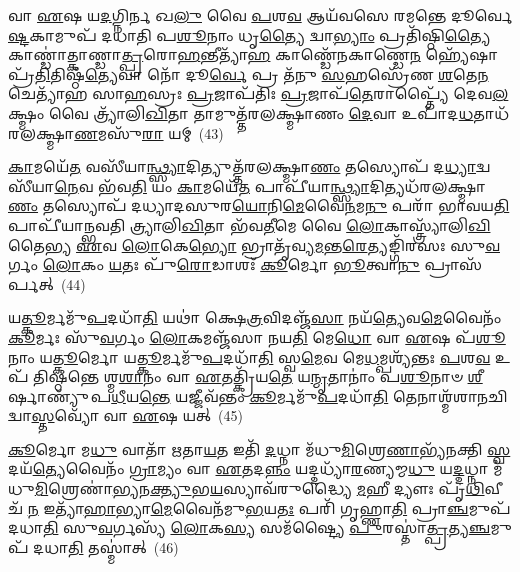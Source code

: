 𑌵𑌾 \ul{𑌏}\-𑌷 𑌯\-\ul{𑌦}\-𑌗𑍍𑌨𑌿𑌰𑍍𑌨 𑌖\-\ul{𑌲𑍁} 𑌵𑍈 \ul{𑌪}\-𑌶\-\ul{𑌵} 𑌆𑌯᳴𑌵𑌸𑍇 𑌰𑌮𑌨𑍍𑌤𑍇 𑌦𑍂𑌰𑍍𑌵𑍇\-\ul{𑌷𑍍𑌟}\-𑌕𑌾𑌮𑍁𑌪᳴ 𑌦𑌧𑌾𑌤𑌿 𑌪\-\ul{𑌶𑍂}\-𑌨𑌾𑌂 𑌧𑍃\-\ul{𑌤𑍍𑌯𑍈} 𑌦𑍍𑌵𑌾\-\ul{𑌭𑍍𑌯𑌾𑌂} 𑌪𑍍𑌰𑌤𑌿᳴𑌷𑍍𑌠𑌿\-\ul{𑌤𑍍𑌯𑍈} 𑌕𑌾𑌣𑍍𑌡𑌾॑𑌤𑍍𑌕𑌾𑌣𑍍𑌡𑌾\-\ul{𑌤𑍍𑌪𑍍𑌰}\-𑌰𑍋\-\ul{𑌹}\-𑌨𑍍𑌤𑍀𑌤𑍍𑌯𑌾᳴\-\ul{𑌹} 𑌕𑌾𑌣𑍍𑌡𑍇᳴𑌨𑌕𑌾𑌣𑍍𑌡𑍇\-\ul{𑌨} 𑌹𑍍𑌯𑍇᳴𑌷𑌾 𑌪𑍍𑌰᳴\-\ul{𑌤𑌿}\-𑌤𑌿𑌷𑍍𑌠᳴\-\ul{𑌤𑍍𑌯𑍇}\-𑌵𑌾 𑌨𑍋᳴ 𑌦𑍂\-\ul{𑌰𑍍𑌵𑍇} 𑌪𑍍𑌰 𑌤᳴𑌨𑍁 \ul{𑌸}\-𑌹𑌸𑍍𑌰𑍇᳴𑌣 \ul{𑌶}\-𑌤𑍇\-\ul{𑌨} 𑌚𑍇𑌤𑍍𑌯𑌾᳴𑌹 𑌸𑌾\-\ul{𑌹}\-𑌸𑍍𑌰𑌃 \ul{𑌪𑍍𑌰}\-𑌜𑌾𑌪᳴𑌤𑌿𑌃 \ul{𑌪𑍍𑌰}\-𑌜𑌾𑌪᳴\-\ul{𑌤𑍇}\-𑌰𑌾𑌪𑍍𑌤𑍍𑌯𑍈᳴ 𑌦𑍇𑌵\-\ul{𑌲}\-𑌕𑍍𑌷𑍍𑌮𑌂 𑌵𑍈 𑌤𑍍𑌰𑍍𑌯𑌾᳴𑌲𑌿\-\ul{𑌖𑌿}\-𑌤𑌾 𑌤𑌾𑌮𑍁𑌤𑍍𑌤᳴𑌰𑌲𑌕𑍍𑌷𑍍𑌮𑌾𑌣𑌂 \ul{𑌦𑍇}\-𑌵𑌾 𑌉𑌪𑌾᳴𑌦\-\ul{𑌧}\-𑌤𑌾𑌧᳴𑌰𑌲𑌕𑍍𑌷𑍍𑌮𑌾\-\ul{𑌣}\-𑌮𑌸𑍁᳴\-\ul{𑌰𑌾} 𑌯𑌮𑍍~(43)

\-\ul{𑌕𑌾}\-𑌮𑌯𑍇᳴\-\ul{𑌤} 𑌵𑌸𑍀᳴𑌯𑌾\-\ul{𑌨𑍍𑌥𑍍𑌸𑍍𑌯𑌾}\-𑌦𑌿𑌤𑍍𑌯𑍁𑌤𑍍𑌤᳴𑌰𑌲𑌕𑍍𑌷𑍍𑌮𑌾\-\ul{𑌣𑌂} 𑌤𑌸𑍍𑌯𑍋𑌪᳴ 𑌦\-\ul{𑌧𑍍𑌯𑌾}\-𑌦𑍍𑌵𑌸𑍀᳴𑌯𑌾\-\ul{𑌨𑍇}\-𑌵 𑌭᳴𑌵\-\ul{𑌤𑌿} 𑌯𑌂 \ul{𑌕𑌾}\-𑌮𑌯𑍇᳴\-\ul{𑌤} 𑌪𑌾𑌪𑍀᳴𑌯𑌾\-\ul{𑌨𑍍𑌥𑍍𑌸𑍍𑌯𑌾}\-𑌦𑌿𑌤𑍍𑌯𑌧᳴𑌰\-𑌲𑌕𑍍𑌷𑍍𑌮𑌾\-\ul{𑌣𑌂} 𑌤𑌸𑍍𑌯𑍋𑌪᳴ 𑌦𑌧𑍍𑌯𑌾𑌦𑌸𑍁𑌰\-\ul{𑌯𑍋}\-𑌨𑌿\-\ul{𑌮𑍇}\-𑌵𑍈\-\ul{𑌨}\-𑌮\-\ul{𑌨𑍁} 𑌪𑌰𑌾᳴ 𑌭𑌾𑌵𑌯\-\ul{𑌤𑌿} 𑌪𑌾𑌪𑍀᳴𑌯𑌾𑌨𑍍𑌭𑌵𑌤𑌿 𑌤𑍍𑌰𑍍𑌯𑌾𑌲𑌿\-\ul{𑌖𑌿}\-𑌤𑌾 𑌭᳴𑌵\-\ul{𑌤𑍀}\-𑌮𑍇 𑌵𑍈 \ul{𑌲𑍋}\-𑌕𑌾\-𑌸𑍍𑌤𑍍𑌰𑍍𑌯𑌾᳴𑌲𑌿\-\ul{𑌖𑌿}\-𑌤𑍈𑌭𑍍𑌯 \ul{𑌏}\-𑌵 \ul{𑌲𑍋}\-𑌕𑍇\-\ul{𑌭𑍍𑌯𑍋} 𑌭𑍍𑌰𑌾𑌤𑍃᳴𑌵𑍍𑌯\-\ul{𑌮}\-𑌨𑍍𑌤\-\ul{𑌰𑍇}\-𑌤𑍍𑌯𑌙𑍍𑌗𑌿᳴𑌰𑌸𑌃 𑌸𑍁\-\ul{𑌵}\-𑌰𑍍𑌗𑌂 \ul{𑌲𑍋}\-𑌕𑌂 \ul{𑌯}\-𑌤𑌃 𑌪𑍁᳴\-\ul{𑌰𑍋}\-𑌡𑌾𑌶𑌃᳴ \ul{𑌕𑍂}\-𑌰𑍍𑌮𑍋 \ul{𑌭𑍂}\-𑌤𑍍𑌵𑌾\-\ul{𑌨𑍁} 𑌪𑍍𑌰𑌾𑌸᳴𑌰𑍍𑌪𑌤𑍍~(44)

𑌯\-\ul{𑌤𑍍𑌕𑍂}\-𑌰𑍍𑌮𑌮𑍁᳴\-\ul{𑌪}\-𑌦𑌧𑌾᳴\-\ul{𑌤𑌿} 𑌯𑌥𑌾॑ 𑌕𑍍𑌷𑍇\-\ul{𑌤𑍍𑌰}\-𑌵𑌿𑌦𑌞𑍍𑌜᳴\-\ul{𑌸𑌾} 𑌨𑌯᳴\-\ul{𑌤𑍍𑌯𑍇}\-𑌵\-\ul{𑌮𑍇}\-𑌵𑍈𑌨𑌂᳴ \ul{𑌕𑍂}\-𑌰𑍍𑌮𑌃 𑌸𑍁᳴\-\ul{𑌵}\-𑌰𑍍𑌗𑌂 \ul{𑌲𑍋}\-𑌕𑌮𑌞𑍍𑌜᳴𑌸𑌾 𑌨𑌯\-\ul{𑌤𑌿} 𑌮𑍇\-\ul{𑌧𑍋} 𑌵𑌾 \ul{𑌏}\-𑌷 𑌪᳴\-\ul{𑌶𑍂}\-𑌨𑌾𑌂 𑌯\-\ul{𑌤𑍍𑌕𑍂}\-𑌰𑍍𑌮𑍋 𑌯\-\ul{𑌤𑍍𑌕𑍂}\-𑌰𑍍𑌮𑌮𑍁᳴\-\ul{𑌪}\-𑌦𑌧𑌾᳴\-\ul{𑌤𑌿} 𑌸𑍍𑌵\-\ul{𑌮𑍇}\-𑌵 𑌮𑍇\-\ul{𑌧}\-𑌮𑍍𑌪𑌶𑍍𑌯᳴𑌨𑍍𑌤𑌃 \ul{𑌪}\-𑌶\-\ul{𑌵} 𑌉𑌪᳴ 𑌤𑌿𑌷𑍍𑌠𑌨𑍍𑌤𑍇 𑌶𑍍𑌮\-\ul{𑌶𑌾}\-𑌨𑌂 𑌵𑌾 \ul{𑌏}\-𑌤𑌤𑍍𑌕𑍍𑌰𑌿᳴𑌯\-\ul{𑌤𑍇} 𑌯\-\ul{𑌨𑍍𑌮𑍃}\-𑌤𑌾𑌨𑌾𑌂॑ 𑌪\-\ul{𑌶𑍂}\-𑌨𑌾𑍞 \ul{𑌶𑍀}\-𑌰𑍍\mbox{}𑌷𑌾𑌣𑍍𑌯𑍁᳴𑌪\-\ul{𑌧𑍀}\-𑌯\-\ul{𑌨𑍍𑌤𑍇} 𑌯𑌜𑍍𑌜𑍀𑌵᳴𑌨𑍍𑌤𑌂 \ul{𑌕𑍂}\-𑌰𑍍𑌮𑌮𑍁᳴\-\ul{𑌪}\-𑌦𑌧𑌾᳴\-\ul{𑌤𑌿} 𑌤𑍇𑌨𑌾𑌶𑍍𑌮᳴𑌶𑌾𑌨𑌚𑌿𑌦𑍍𑌵𑌾\-\ul{𑌸𑍍𑌤}\-𑌵𑍍𑌯𑍋᳴ 𑌵𑌾 \ul{𑌏}\-𑌷 𑌯𑌤𑍍~(45)

\-\ul{𑌕𑍂}\-𑌰𑍍𑌮𑍋 𑌮\-\ul{𑌧𑍁} 𑌵𑌾𑌤𑌾᳴ 𑌋𑌤𑌾\-\ul{𑌯}\-𑌤 𑌇𑌤𑌿᳴ \ul{𑌦}\-𑌧𑍍𑌨𑌾 𑌮᳴𑌧𑍁\-\ul{𑌮𑌿}\-𑌶𑍍𑌰𑍇\-\ul{𑌣𑌾}\-𑌭𑍍𑌯᳴𑌨𑌕𑍍𑌤𑌿 \ul{𑌸𑍍𑌵}\-𑌦𑌯᳴\-\ul{𑌤𑍍𑌯𑍇}\-𑌵𑍈𑌨𑌂᳴ \ul{𑌗𑍍𑌰𑌾}\-𑌮𑍍𑌯𑌂 𑌵𑌾 \ul{𑌏}\-𑌤𑌦\-\ul{𑌨𑍍𑌨𑌂} 𑌯𑌦𑍍𑌦𑌧𑍍𑌯𑌾᳴\-\ul{𑌰}\-𑌣𑍍𑌯𑌮𑍍𑌮\-\ul{𑌧𑍁} 𑌯\-\ul{𑌦𑍍𑌦}\-𑌧𑍍𑌨𑌾 𑌮᳴𑌧𑍁\-\ul{𑌮𑌿}\-𑌶𑍍𑌰𑍇𑌣𑌾॑\-\ul{𑌭𑍍𑌯}\-𑌨\-\ul{𑌕𑍍𑌤𑍍𑌯𑍁}\-𑌭\-\ul{𑌯}\-𑌸𑍍𑌯𑌾𑌵᳴𑌰𑍁𑌦𑍍𑌧𑍍𑌯𑍈 \ul{𑌮}\-𑌹𑍀 𑌦𑍍𑌯𑍗𑌃 𑌪𑍃᳴\-\ul{𑌥𑌿}\-𑌵𑍀 𑌚᳴ \ul{𑌨} 𑌇𑌤𑍍𑌯𑌾᳴\-\ul{𑌹𑌾}\-𑌭𑍍𑌯𑌾\-\ul{𑌮𑍇}\-𑌵𑍈𑌨᳴𑌮𑍁\-\ul{𑌭}\-𑌯\-\ul{𑌤𑌃} 𑌪𑌰𑌿᳴ 𑌗𑍃𑌹𑍍𑌣𑌾\-\ul{𑌤𑌿} 𑌪𑍍𑌰𑌾\-\ul{𑌞𑍍𑌚}\-𑌮𑍁𑌪᳴ 𑌦𑌧𑌾\-\ul{𑌤𑌿} 𑌸𑍁\-\ul{𑌵}\-𑌰𑍍𑌗𑌸𑍍𑌯᳴ \ul{𑌲𑍋}\-𑌕\-\ul{𑌸𑍍𑌯} 𑌸𑌮᳴𑌷𑍍𑌟𑍍𑌯𑍈 \ul{𑌪𑍁}\-𑌰𑌸𑍍𑌤𑌾॑\-\ul{𑌤𑍍𑌪𑍍𑌰}\-𑌤𑍍𑌯\-\ul{𑌞𑍍𑌚}\-𑌮𑍁𑌪᳴ 𑌦𑌧𑌾\-\ul{𑌤𑌿} 𑌤𑌸𑍍𑌮𑌾॑𑌤𑍍~(46)

